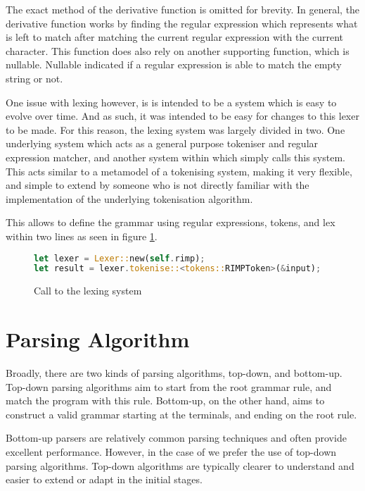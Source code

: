 \newpage
The exact method of the derivative function is omitted for brevity. In general, the derivative function works by finding the regular expression which represents what is left to match after matching the current regular expression with the current character. This function does also rely on another supporting function, which is nullable. Nullable indicated if a regular expression is able to match the empty string or not.

One issue with lexing however, is \rimp is intended to be a system which is easy to evolve over time. And as such, it was intended to be easy for changes to this lexer to be made.
For this reason, the lexing system was largely divided in two. One underlying system which acts as a general purpose tokeniser and regular expression matcher, and another system within \rimp which simply calls this system. This acts similar to a metamodel of a tokenising system, making it very flexible, and simple to extend by someone who is not directly familiar with the implementation of the underlying tokenisation algorithm.

This allows \rimp to define the grammar using regular expressions, tokens, and lex within two lines as seen in figure \ref{fig:lexing_system}.

\begin{figure}[ht]
    \centering
    \begin{lstlisting}[language=Rust,label={lst:derivative}]
let lexer = Lexer::new(self.rimp);
let result = lexer.tokenise::<tokens::RIMPToken>(&input);
    \end{lstlisting}
    \caption{Call to the lexing system}
    \label{fig:lexing_system}
\end{figure}


\section{Parsing Algorithm}\label{sec:ParsingAlgorithm}

Broadly, there are two kinds of parsing algorithms, top-down\cite{PrattTDOP, TotalCombinators, AmbiguousCombinators}, and bottom-up\cite{LRParsing}. Top-down parsing algorithms aim to start from the root grammar rule, and match the program with this rule. Bottom-up, on the other hand, aims to construct a valid grammar starting at the terminals, and ending on the root rule.

Bottom-up parsers are relatively common parsing techniques and often provide excellent performance. However, in the case of \rimp we prefer the use of top-down parsing algorithms. Top-down algorithms are typically clearer to understand and easier to extend or adapt in the initial stages. 

